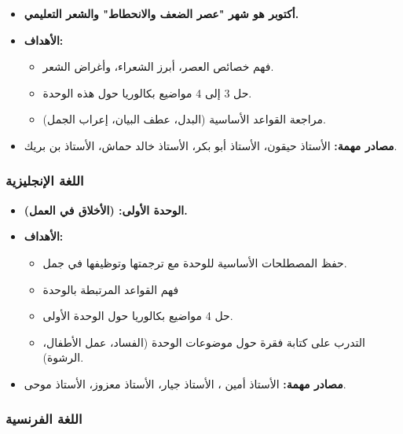 \documentclass[12pt,a4paper]{book}
\begin{document}
	\begin{itemize}
		\item \textbf{أكتوبر هو شهر "عصر الضعف والانحطاط" والشعر التعليمي.}
		\item \textbf{الأهداف:}
		\begin{itemize}
			\item فهم خصائص العصر، أبرز الشعراء، وأغراض الشعر.
			\item حل 3 إلى 4 مواضيع بكالوريا حول هذه الوحدة.
			\item مراجعة القواعد الأساسية (البدل، عطف البيان، إعراب الجمل).
		\end{itemize}
		\item \textbf{مصادر مهمة:} الأستاذ حيقون، الأستاذ أبو بكر، الأستاذ خالد حماش، الأستاذ بن بريك.
	\end{itemize}
	
	\subsubsection{اللغة الإنجليزية}
	
	\begin{itemize}
		\item \textbf{الوحدة الأولى:  (الأخلاق في العمل).}
		\item \textbf{الأهداف:}
		\begin{itemize}
			\item حفظ المصطلحات الأساسية للوحدة مع ترجمتها وتوظيفها في جمل.
			\item فهم القواعد المرتبطة بالوحدة 
			\item حل 4 مواضيع بكالوريا حول الوحدة الأولى.
			\item التدرب على كتابة فقرة  حول موضوعات الوحدة (الفساد، عمل الأطفال، الرشوة).
		\end{itemize}
		\item \textbf{مصادر مهمة:} الأستاذ أمين ، الأستاذ جيار، الأستاذ معزوز، الأستاذ موحى.
	\end{itemize}
	
	\subsubsection{اللغة الفرنسية}
	
\end{document}

